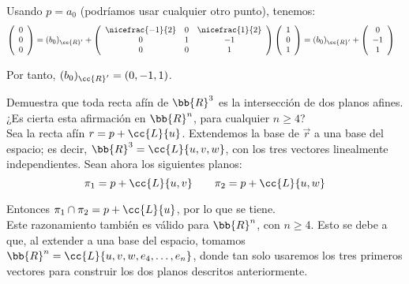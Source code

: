 \begin{ejercicio}
     Usando $p=a_0$ (podríamos usar cualquier otro punto), tenemos:
     \begin{equation*}\begin{split}
         \left(\begin{array}{c}
             0 \\ 0 \\ 0
         \end{array}\right) &= (b_0)_{\cc{R}'} + \left(
            \begin{array}{ccc}
                \nicefrac{-1}{2} & 0 & \nicefrac{1}{2} \\
                0 & 1 & -1 \\
                0 & 0 & 1
            \end{array}
         \right)\left(\begin{array}{c}
             1 \\ 0 \\ 1
         \end{array}\right)
         = (b_0)_{\cc{R}'} + \left(\begin{array}{c}
             0 \\ -1 \\ 1
         \end{array}\right)
     \end{split}\end{equation*}

     Por tanto, $(b_0)_{\cc{R}'} = (0, -1, 1)$.
\end{ejercicio}

\begin{ejercicio}
    Demuestra que toda recta afín de $\bb{R}^3$ es la intersección de dos planos afines. ¿Es cierta esta afirmación en $\bb{R}^n$, para cualquier $n \geq 4$?\\

    Sea la recta afín $r=p+\cc{L}\{u\}$. Extendemos la base de $\vec{r}$ a una base del espacio; es decir, $\bb{R}^3=\cc{L}\{u,v,w\}$, con los tres vectores linealmente independientes. Sean ahora los siguientes planos:
    \begin{equation*}
        \pi_1 = p+\cc{L}\{u,v\} \qquad \pi_2 = p+\cc{L}\{u,w\}
    \end{equation*}

    Entonces $\pi_1\cap \pi_2 =  p + \cc{L}\{u\}$, por lo que se tiene.\\

    Este razonamiento también es válido para $\bb{R}^n$, con $n\geq 4$. Esto se debe a que, al extender a una base del espacio, tomamos $\bb{R}^n=\cc{L}\{u,v,w,e_4,\dots,e_n\}$, donde tan solo usaremos los tres primeros vectores para construir los dos planos descritos anteriormente.
\end{ejercicio}

